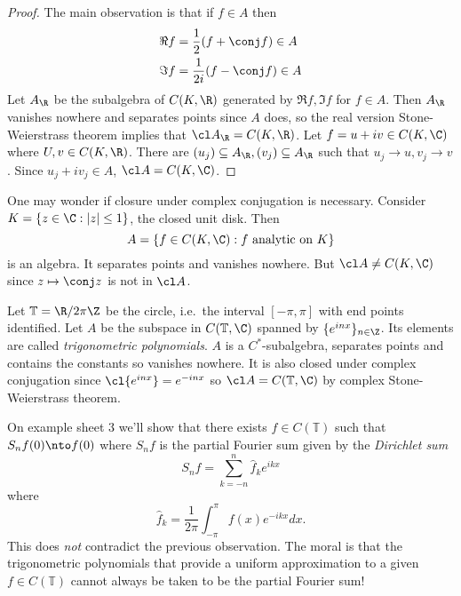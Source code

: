 \documentclass[a4paper]{article}
\begin{document}
\begin{proof}
  The main observation is that if \(f \in A\) then
  \begin{align*}
    \Re f &= \frac{1}{2} (f + \conj f) \in A \\
    \Im f &= \frac{1}{2i} (f - \conj f) \in A
  \end{align*}
  Let \(A_\R\) be the subalgebra of \(C(K, \R)\) generated by \(\Re f, \Im f\) for \(f \in A\). Then \(A_\R\) vanishes nowhere and separates points since \(A\) does, so the real version Stone-Weierstrass theorem implies that \(\cl A_\R = C(K, \R)\). Let \(f = u + iv \in C(K, \C)\) where \(U, v \in C(K, \R)\). There are \((u_j) \subseteq A_\R, (v_j) \subseteq A_\R\) such that \(u_j \to u, v_j \to v\). Since \(u_j + iv_j \in A\), \(\cl A = C(K, \C)\).
\end{proof}

\begin{eg}
  One may wonder if closure under complex conjugation is necessary. Consider \(K = \{z \in \C: |z| \leq 1\}\), the closed unit disk. Then
  \[
    A = \{f \in C(K, \C): f \text{ analytic on } K\}
  \]
  is an algebra. It separates points and vanishes nowhere. But \(\cl A \neq C(K, \C)\) since \(z \mapsto \conj z\) is not in \(\cl A\).
\end{eg}

\begin{eg}
  Let \(\mathbb T = \R/2\pi\Z\) be the circle, i.e.\ the interval \([-\pi, \pi]\) with end points identified. Let \(A\) be the subspace in \(C(\mathbb T, \C)\) spanned by \(\{e^{inx}\}_{n \in \Z}\). Its elements are called \emph{trigonometric polynomials}. \(A\) is a \(C^*\)-subalgebra, separates points and contains the constants so vanishes nowhere. It is also closed under complex conjugation since \(\cl{e^{inx}} = e^{-inx}\) so \(\cl A = C(\mathbb T, \C)\) by complex Stone-Weierstrass theorem.
\end{eg}

\begin{eg}
  On example sheet 3 we'll show that there exists \(f \in C(\mathbb T)\) such that \(S_nf(0) \nto f(0)\) where \(S_nf\) is the partial Fourier sum given by the \emph{Dirichlet sum}
  \[
    S_nf = \sum_{k = -n}^n \hat f_k e^{ikx}
  \]
  where
  \[
    \hat f_k = \frac{1}{2\pi} \int_{-\pi}^\pi f(x) e^{-ikx} dx.
  \]
  This does \emph{not} contradict the previous observation. The moral is that the trigonometric polynomials that provide a uniform approximation to a given \(f \in C(\mathbb T)\) cannot always be taken to be the partial Fourier sum!
\end{eg}
\end{document}
